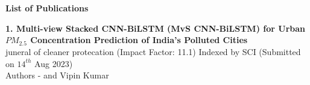 
\chapter*{}
\vspace*{-3.5cm}

\vspace{11ex}
\addchaptertocentry{\listofpublication} %
    \textbf{\huge {List of Publications}}

\vspace{7ex}



\noindent\textbf{1. Multi-view Stacked CNN-BiLSTM (MvS CNN-BiLSTM) for Urban $PM_{2.5}$ Concentration Prediction of India's Polluted Cities }\\ juneral of cleaner protecation (Impact Factor: 11.1) Indexed by SCI (Submitted on $14^{th}$ Aug 2023)\\
Authors - \fAuthor { }and  Vipin Kumar\\




\vspace*{0.7cm}
